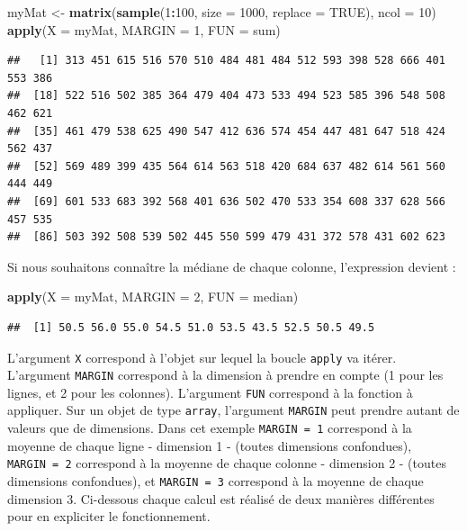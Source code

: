 \documentclass[]{book}
\newenvironment{Shaded}{\begin{snugshade}}{\end{snugshade}}
\newcommand{\DataTypeTok}[1]{\textcolor[rgb]{0.13,0.29,0.53}{#1}}
\newcommand{\DecValTok}[1]{\textcolor[rgb]{0.00,0.00,0.81}{#1}}
\newcommand{\KeywordTok}[1]{\textcolor[rgb]{0.13,0.29,0.53}{\textbf{#1}}}
\newcommand{\NormalTok}[1]{#1}
\newcommand{\OperatorTok}[1]{\textcolor[rgb]{0.81,0.36,0.00}{\textbf{#1}}}
\newcommand{\OtherTok}[1]{\textcolor[rgb]{0.56,0.35,0.01}{#1}}
\newcommand{\StringTok}[1]{\textcolor[rgb]{0.31,0.60,0.02}{#1}}
\begin{document}
\begin{Shaded}
\begin{Highlighting}[]
\NormalTok{myMat <-}\StringTok{ }\KeywordTok{matrix}\NormalTok{(}\KeywordTok{sample}\NormalTok{(}\DecValTok{1}\OperatorTok{:}\DecValTok{100}\NormalTok{, }\DataTypeTok{size =} \DecValTok{1000}\NormalTok{, }\DataTypeTok{replace =} \OtherTok{TRUE}\NormalTok{), }\DataTypeTok{ncol =} \DecValTok{10}\NormalTok{)}
\KeywordTok{apply}\NormalTok{(}\DataTypeTok{X =}\NormalTok{ myMat, }\DataTypeTok{MARGIN =} \DecValTok{1}\NormalTok{, }\DataTypeTok{FUN =}\NormalTok{ sum)}
\end{Highlighting}
\end{Shaded}

\begin{verbatim}
##   [1] 313 451 615 516 570 510 484 481 484 512 593 398 528 666 401 553 386
##  [18] 522 516 502 385 364 479 404 473 533 494 523 585 396 548 508 462 621
##  [35] 461 479 538 625 490 547 412 636 574 454 447 481 647 518 424 562 437
##  [52] 569 489 399 435 564 614 563 518 420 684 637 482 614 561 560 444 449
##  [69] 601 533 683 392 568 401 636 502 470 533 354 608 337 628 566 457 535
##  [86] 503 392 508 539 502 445 550 599 479 431 372 578 431 602 623
\end{verbatim}

Si nous souhaitons connaître la médiane de chaque colonne, l'expression devient :

\begin{Shaded}
\begin{Highlighting}[]
\KeywordTok{apply}\NormalTok{(}\DataTypeTok{X =}\NormalTok{ myMat, }\DataTypeTok{MARGIN =} \DecValTok{2}\NormalTok{, }\DataTypeTok{FUN =}\NormalTok{ median)}
\end{Highlighting}
\end{Shaded}

\begin{verbatim}
##  [1] 50.5 56.0 55.0 54.5 51.0 53.5 43.5 52.5 50.5 49.5
\end{verbatim}

L'argument \texttt{X} correspond à l'objet sur lequel la boucle \texttt{apply} va itérer. L'argument \texttt{MARGIN} correspond à la dimension à prendre en compte (1 pour les lignes, et 2 pour les colonnes). L'argument \texttt{FUN} correspond à la fonction à appliquer. Sur un objet de type \texttt{array}, l'argument \texttt{MARGIN} peut prendre autant de valeurs que de dimensions. Dans cet exemple \texttt{MARGIN\ =\ 1} correspond à la moyenne de chaque ligne - dimension 1 - (toutes dimensions confondues), \texttt{MARGIN\ =\ 2} correspond à la moyenne de chaque colonne - dimension 2 - (toutes dimensions confondues), et \texttt{MARGIN\ =\ 3} correspond à la moyenne de chaque dimension 3. Ci-dessous chaque calcul est réalisé de deux manières différentes pour en expliciter le fonctionnement.
\end{document}
